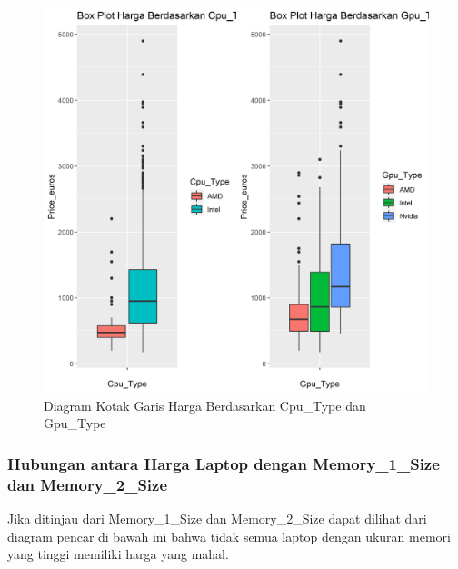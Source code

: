 \documentclass[12pt]{article}
\begin{document}
\begin{figure}[h!]
    \centering
    \includegraphics[scale = 0.4]{boxplot_price3.png}
    \caption{Diagram Kotak Garis Harga Berdasarkan Cpu\_Type dan Gpu\_Type}
    \label{Resol}
\end{figure}  

\subsubsection{Hubungan antara Harga Laptop dengan Memory\_1\_Size dan Memory\_2\_Size}
Jika ditinjau dari Memory\_1\_Size dan Memory\_2\_Size dapat dilihat dari diagram pencar di bawah ini bahwa tidak semua laptop dengan ukuran memori yang tinggi memiliki harga yang mahal.   
\end{document}
